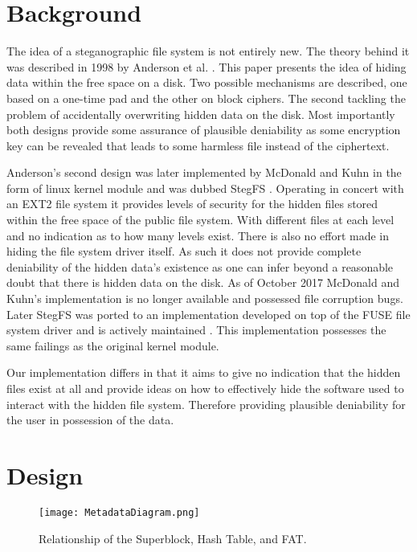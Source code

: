 \documentclass{article}
\begin{document}
\begin{multicols}{2}
\section{Background}
The idea of a steganographic file system is not entirely new. The theory behind it was described in 1998 by Anderson et al. \cite{anderson1998steganographic}. This paper presents the idea of hiding data within the free space on a disk.  Two possible mechanisms are described, one based on a one-time pad and the other on block ciphers. The second tackling the problem of accidentally overwriting hidden data on the disk. Most importantly both designs provide some assurance of plausible deniability as some encryption key can be revealed that leads to some harmless file instead of the ciphertext.

Anderson's second design was later implemented by McDonald and Kuhn in the form of linux kernel module and was dubbed StegFS \cite{mcdonald1999stegfs}. Operating in concert with an EXT2 file system it provides levels of security for the hidden files stored within the free space of the public file system. With different files at each level and no indication as to how many levels exist. There is also no effort made in hiding the file system driver itself. As such it does not provide complete deniability of the hidden data's existence as one can infer beyond a reasonable doubt that there is hidden data on the disk. As of October 2017 McDonald and Kuhn's implementation is no longer available and possessed file corruption bugs. Later StegFS was ported to an implementation developed on top of the FUSE file system driver and is actively maintained \cite{stegfsDev}. This implementation possesses the same failings as the original kernel module.

Our implementation differs in that it aims to give no indication that the hidden files exist at all and provide ideas on how to effectively hide the software used to interact with the hidden file system. Therefore providing plausible deniability for the user in possession of the data.

\section{Design}

\begin{figure*}
  \centering
  \texttt{[image: MetadataDiagram.png]}
  \caption{Relationship of the Superblock, Hash Table, and FAT.}
  \label{fig:design1}
\end{figure*}


\end{multicols}
\end{document}
